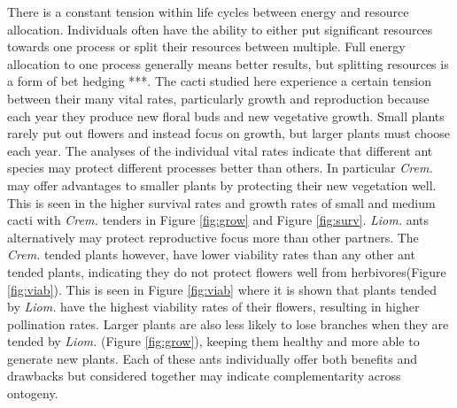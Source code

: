 \documentclass[12pt,a4paper]{article}
\begin{document}
     There is a constant tension within life cycles between energy and resource allocation. Individuals often have the ability to either put significant resources towards one process or split their resources between multiple. Full energy allocation to one process generally means better results, but splitting resources is a form of bet hedging ***. The cacti studied here experience a certain tension between their many vital rates, particularly growth and reproduction because each year they produce new floral buds and new vegetative growth. Small plants rarely put out flowers and instead focus on growth, but larger plants must choose each year. The analyses of the individual vital rates indicate that different ant species may protect different processes better than others. In particular \textit{Crem.} may offer advantages to smaller plants by protecting their new vegetation well. This is seen in the higher survival rates and growth rates of small and medium cacti with \textit{Crem.} tenders in Figure \ref{fig:grow} and Figure \ref{fig:surv}. \textit{Liom.} ants alternatively may protect reproductive focus more than other partners. The \textit{Crem.} tended plants however, have lower viability rates than any other ant tended plants, indicating they do not protect flowers well from herbivores(Figure \ref{fig:viab}). This is seen in Figure \ref{fig:viab} where it is shown that plants tended by \textit{Liom.} have the highest viability rates of their flowers, resulting in higher pollination rates. Larger plants are also less likely to lose branches when they are tended by \textit{Liom.} (Figure \ref{fig:grow}), keeping them healthy and more able to generate new plants. Each of these ants individually offer both benefits and drawbacks but considered together may indicate complementarity across ontogeny. 
     
\end{document}

